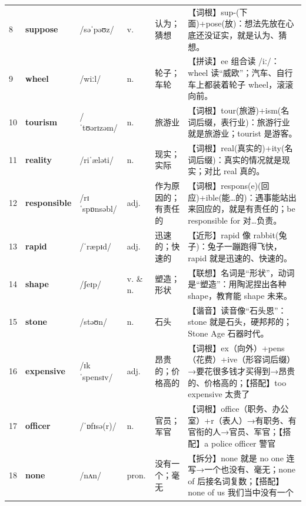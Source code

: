 \documentclass[UTF8,a4paper,11pt,oneside]{ctexbook}
\newcommand{\cellword}[1]{{\bfseries\textcolor{wordcol}{#1}}}
\newcommand{\cellipa}[1]{{\footnotesize\textcolor{ipacol}{#1}}}
\newcommand{\cellpos}[1]{\textcolor{poscol}{#1}}
\newcommand{\cellno}[1]{\textcolor{volcolor!75!black}{#1}}
\begin{document}
{\begin{longtable}{@{}C{0.045\textwidth}L{0.155\textwidth}L{0.175\textwidth}C{0.070\textwidth}L{0.180\textwidth}L{0.282\textwidth}@{}}
\cellno{8} & \cellword{suppose} & \cellipa{/səˈpəʊz/} & \cellpos{v.} & 认为；猜想 & \textcolor{tagRoot}{【词根】}sup-(下面)+pose(放)：想法先放在心底还没证实，就是认为、猜想。 \\
 \cellno{9} & \cellword{wheel} & \cellipa{/wiːl/} & \cellpos{n.} & 轮子；车轮 & \textcolor{tagSpell}{【拼读】}ee 组合读 /iː/：wheel 读“威欧”；汽车、自行车上都装着轮子 wheel，滚滚向前。 \\
\cellno{10} & \cellword{tourism} & \cellipa{/ˈtʊərɪzəm/} & \cellpos{n.} & 旅游业 & \textcolor{tagRoot}{【词根】}tour(旅游)+ism(名词后缀，表行业)：旅游行业就是旅游业；tourist 是游客。 \\
 \cellno{11} & \cellword{reality} & \cellipa{/riˈæləti/} & \cellpos{n.} & 现实；实际 & \textcolor{tagRoot}{【词根】}real(真实的)+ity(名词后缀)：真实的情况就是现实；对比 real 真的。 \\
\cellno{12} & \cellword{responsible} & \cellipa{/rɪˈspɒnsəbl/} & \cellpos{adj.} & 作为原因的；有责任的 & \textcolor{tagRoot}{【词根】}respons(e)(回应)+ible(能…的)：遇事能站出来回应的，就是有责任的；be responsible for 对…负责。 \\
 \cellno{13} & \cellword{rapid} & \cellipa{/ˈræpɪd/} & \cellpos{adj.} & 迅速的；快速的 & \textcolor{tagNear}{【近形】}rapid 像 rabbit(兔子)：兔子一蹦跑得飞快，rapid 就是迅速的、快速的。 \\
\cellno{14} & \cellword{shape} & \cellipa{/ʃeɪp/} & \cellpos{v.  \& n.} & 塑造；形状 & \textcolor{tagAssoc}{【联想】}名词是“形状”，动词是“塑造”：用陶泥捏出各种 shape，教育能 shape 未来。 \\
 \cellno{15} & \cellword{stone} & \cellipa{/stəʊn/} & \cellpos{n.} & 石头 & \textcolor{tagSound}{【谐音】}读音像“石头恩”：stone 就是石头，硬邦邦的；Stone Age 石器时代。 \\
\cellno{16} & \cellword{expensive} & \cellipa{/ɪkˈspensɪv/} & \cellpos{adj.} & 昂贵的；价格高的 & \textcolor{tagRoot}{【词根】}ex（向外）+pens（花费）+ive（形容词后缀）→\allowbreak{}要花很多钱才买得到→\allowbreak{}昂贵的、价格高的；\textcolor{tagColloc}{【搭配】}too expensive 太贵了 \\
 \cellno{17} & \cellword{officer} & \cellipa{/ˈɒfɪsə(r)/} & \cellpos{n.} & 官员；军官 & \textcolor{tagRoot}{【词根】}office（职务、办公室）+r（表人）→\allowbreak{}有职务、有官衔的人→\allowbreak{}官员、军官；\textcolor{tagColloc}{【搭配】}a police officer 警官 \\
\cellno{18} & \cellword{none} & \cellipa{/nʌn/} & \cellpos{pron.} & 没有一个；毫无 & \textcolor{tagSplit}{【拆分】}none 就是 no one 连写→\allowbreak{}一个也没有、毫无；none of 后接名词复数；\textcolor{tagColloc}{【搭配】}none of us 我们当中没有一个 \\

\end{longtable}}
\end{document}
